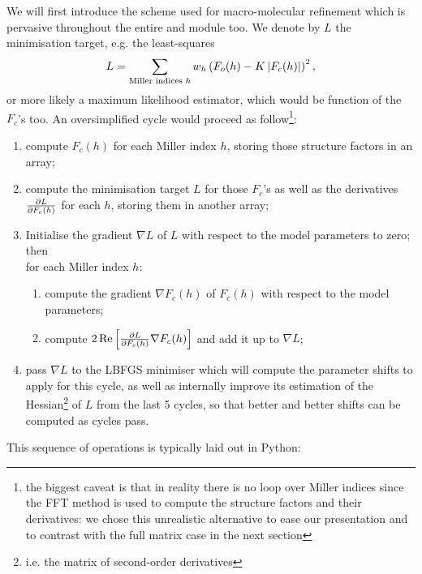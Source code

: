 \documentclass[12pt]{article}
\begin{document}
We will first introduce the scheme used for macro-molecular refinement which is pervasive throughout the entire \mmtbx and \cctbx module too. We denote by $L$ the minimisation target, e.g. the least-squares
\begin{equation}
L = \sum_{\text{Miller indices $h$}} w_h \left(F_o(h) - K \left| F_c(h) \right|\right)^2,
\end{equation}
or more likely a maximum likelihood estimator, which would be function of the $F_c$'s too. An oversimplified cycle would proceed as follow\footnote{the biggest caveat is that in reality there is no loop over Miller indices since the FFT method is used to compute the structure factors and their derivatives: we chose this unrealistic alternative to ease our presentation and to contrast with the full matrix case in the next section}:
\begin{enumerate}
\item compute $F_c(h)$ for each Miller index $h$, storing those structure factors in an array;
\label{itemcomputefcalc}
\item compute the minimisation target $L$ for those $F_c$'s as well as the derivatives $\frac{\partial L}{\partial F_c(h)}$ for each $h$, storing them in another array;
\label{itemtargetlinearisation}
\item Initialise the gradient $\nabla L$ of $L$ with respect to the model parameters to zero; 
then\\ for each Miller index $h$:
\begin{enumerate}
\item compute the gradient $\nabla F_c(h)$ of $F_c(h)$ with respect to the model parameters;
\item compute $2\operatorname{Re} \left[\frac{\partial L}{\partial F_c(h)} \nabla F_c(h)\right]$ and add it up to $\nabla L$;
\end{enumerate}
\label{itemgradtarget}
\item pass $\nabla L$ to the LBFGS minimiser which will compute the parameter shifts to apply for this cycle, as well as internally improve its estimation of the Hessian\footnote{i.e. the matrix of second-order derivatives} of $L$ from the last 5 cycles, so that better and better shifts can be computed as cycles pass.
\end{enumerate}

This sequence of operations is typically laid out in Python:
\end{document}
